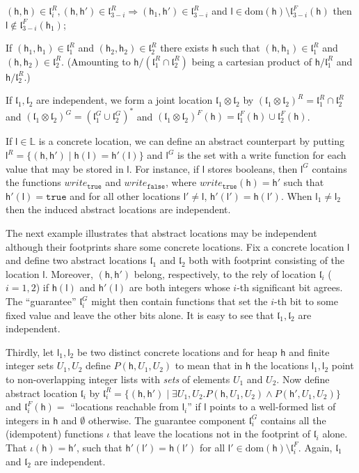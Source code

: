 \documentclass[orivec]{llncs}
\newcommand{\keywd}[1]{\mathtt{#1}}
\newcommand{\mtrue}{\keywd{true}}
\newcommand{\mfalse}{\keywd{false}}
\newcommand{\labs}{\mathbb{L}}
\newcommand{\dom}[1]{\mathrm{dom}({#1})}
\newcommand{\Locs}{\ensuremath{\labs}}
\newcommand{\loc}{\mathfrak{l}}
\newcommand{\cloc}{\ensuremath{\mathsf{l}}\xspace}
\newcommand\heap{\ensuremath{\mathsf{h}}\xspace}
\begin{document}
\begin{definition}
\begin{compactitem}
$(\heap,\heap)\in\loc_i^R, (\heap,\heap')\in\loc_{3-i}^R\Rightarrow (\heap_1,\heap')\in\loc_{3-i}^R$
and
$\cloc\in\dom\heap\setminus\loc_{3-i}^F(\heap)$
then $\cloc\notin\loc_{3-i}^F(\heap_1)$;
\item If $(\heap_1,\heap_1)\in\loc_1^R$ and $(\heap_2,\heap_2)\in\loc_2^R$
there exists $\heap$ such that $(\heap,\heap_1)\in\loc_1^R$ and
$(\heap,\heap_2)\in\loc_2^R$. (Amounting to
$\heap/(\loc_1^R\cap\loc_2^R)$ being a cartesian product of $\heap/\loc_1^R$ and $\heap/\loc_2^R$.)
\end{compactitem}
If $\loc_1, \loc_2$ are independent, we form a joint location
$\loc_1\otimes\loc_2$ by $(\loc_1\otimes\loc_2)^R=\loc_1^R\cap\loc_2^R$
and
$(\loc_1\otimes\loc_2)^G=(\loc_1^G\cup\loc_2^G)^*$ and
$(\loc_1\otimes\loc_2)^F(\heap)=\loc_1^F(\heap)\cup\loc_2^F(\heap)$. 

\end{definition}



If $\cloc\in\Locs$ is a concrete location, we can define an abstract
counterpart by putting $\cloc^R=\{(\heap,\heap')\mid
\heap(\cloc)=\heap'(\cloc)\}$ and $\cloc^G$ is the set with a
write function for each value that may be stored in $\cloc$. 
For instance, if $\cloc$ stores booleans, then $\cloc^G$ contains the
functions $write_\mtrue$ and $write_\mfalse$, where
$write_\mtrue(\heap) = \heap'$ such that $\heap'(\cloc) =
\mtrue$ and 
for all other locations $\cloc' \neq \cloc$, $\heap'(\cloc') =
\heap(\cloc')$.
When $\cloc_1 \neq \cloc_2$ then the induced abstract locations are
independent.

The next example illustrates that abstract locations may be
independent although their footprints share some concrete locations.
Fix a concrete location $\cloc$ and define two abstract
locations $\loc_1$ and $\loc_2$ both with footprint consisting of the
location $\cloc$. Moreover, $(\heap, \heap')$ belong, respectively, to
the rely of location $\loc_i$ ($i=1,2$) if $\heap(\cloc)$ and
$\heap'(\cloc)$ are both integers whose $i$-th significant bit
agrees. The ``guarantee'' $\loc_i^G$ might then contain functions that
set the $i$-th bit to some fixed value and leave the other bits
alone. It is easy to see that $\loc_1,\loc_2$ are independent.

Thirdly, let $\cloc_1, \cloc_2$ be two distinct concrete locations and
for heap $\heap$ and finite integer sets $U_1,U_2$ define
$P(\heap,U_1,U_2)$ to mean that in $\heap$ the locations $\cloc_1,
\cloc_2$ point to non-overlapping integer lists with \emph{sets} of
elements $U_1$ and $U_2$. Now define abstract location $\loc_i$ by
$\loc_i^R= \{(\heap,\heap')\mid \exists
U_1,U_2.P(\heap,U_1,U_2)\wedge P(\heap',U_1,U_2)\}$ 
 and $\loc_i^F(\heap)=$ ``locations reachable from
$\cloc_i$'' if $\cloc$ points to a well-formed list of integers in
$\heap$ and $\emptyset$ otherwise. The guarantee component $\loc_i^G$
contains all the (idempotent) functions $\iota$ that leave the locations
not in the footprint of $\loc_i$ alone. That $\iota(\heap) = \heap'$,
such that $\heap'(\cloc') = \heap(\cloc')$ for all $\cloc' \in
\dom{\heap}\setminus \loc_i^F$.
Again, $\loc_1$ and $\loc_2$ are independent.
\end{document}
